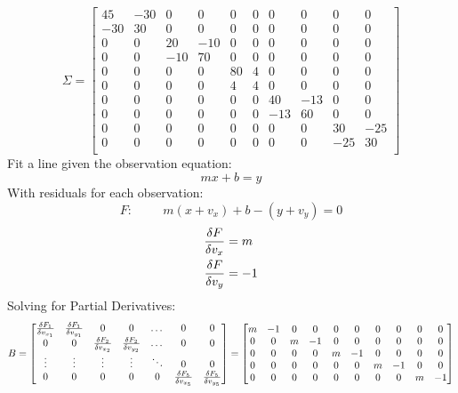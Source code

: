\[
\Sigma = 
 \begin{bmatrix}
 45&-30&0&0&0&0&0&0&0&0\\
 -30&30&0&0&0&0&0&0&0&0\\
 0&0&20&-10&0&0&0&0&0&0\\
 0&0&-10&70&0&0&0&0&0&0\\
 0&0&0&0&80&4&0&0&0&0\\
 0&0&0&0&4&4&0&0&0&0\\
 0&0&0&0&0&0&40&-13&0&0\\
 0&0&0&0&0&0&-13&60&0&0\\
 0&0&0&0&0&0&0&0&30&-25\\
 0&0&0&0&0&0&0&0&-25&30\\
 \end{bmatrix}
\]
Fit a line given the observation equation:
\[
mx + b = y 
\]
With residuals for each observation:
\[
F: \hspace{1cm} m(x+v_x) + b - (y+v_y) = 0 
\]
\begin{align*}
\frac{\delta F}{\delta v_x} &= m \\
\frac{\delta F}{\delta v_y} &= -1\\
\end{align*}
Solving for Partial Derivatives:
\[
B = 
\begin{bmatrix}
\frac{\delta F_1}{\delta v_{x_1}} & \frac{\delta F_1}{\delta v_{y_1}} & 0 & 0 & \dots & 0 & 0 \\
0 & 0 & \frac{\delta F_2}{\delta v_{x_2}} & \frac{\delta F_2}{\delta v_{y_2}} &  \dots  & 0 & 0 \\
\vdots & \vdots & \vdots & \vdots & \ddots & 0 & 0 \\
0 & 0 & 0 & 0 & 0 & \frac{\delta F_5}{\delta v_{x_5}} & \frac{\delta F_5}{\delta v_{y_5}} \\
\end{bmatrix}
=
\begin{bmatrix}
m & -1 & 0 & 0 & 0 & 0 & 0 & 0 & 0 & 0 \\
0 & 0 & m & -1 & 0 & 0 & 0 & 0 & 0 & 0 \\
0 & 0 & 0 & 0 & m & -1 & 0 & 0 & 0 & 0 \\
0 & 0 & 0 & 0 & 0 & 0 & m & -1 & 0 & 0 \\
0 & 0 & 0 & 0 & 0 & 0 & 0 & 0 & m & -1 \\
\end{bmatrix}
\]
